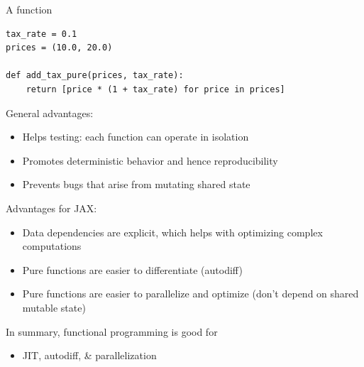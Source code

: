 \begin{frame}[fragile]

    A  function
    \vspace{0.5em}
    \vspace{0.5em}

    \begin{verbatim}
tax_rate = 0.1 
prices = (10.0, 20.0) 

def add_tax_pure(prices, tax_rate):
    return [price * (1 + tax_rate) for price in prices]
    \end{verbatim}
    
\end{frame}


\begin{frame}

    General advantages:

    \begin{itemize}
        \item Helps testing: each function can operate in isolation
        \vspace{0.5em}
        \item Promotes deterministic behavior and hence reproducibility
        \vspace{0.5em}
        \item Prevents bugs that arise from mutating shared state
    \end{itemize}

\end{frame}



\begin{frame}
    
    Advantages for JAX:

     \begin{itemize}
        \item Data dependencies are explicit, which helps with optimizing complex computations 
        \vspace{0.5em}
         \item Pure functions are easier to differentiate (autodiff)
        \vspace{0.5em}
         \item Pure functions are easier to parallelize and optimize (don't
             depend on shared mutable state)
     \end{itemize}

        \vspace{0.5em}
        \vspace{0.5em}

     In summary, functional programming is good for 
     \begin{itemize}
         \item JIT, autodiff, \& parallelization
     \end{itemize}


\end{frame}



